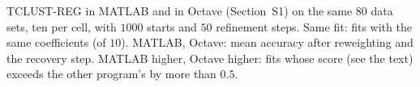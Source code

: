 \begin{table}[htbp]
\centering
\footnotesize
\caption{TCLUST-REG in MATLAB and in Octave (Section~S1) on the same $80$ data sets, ten per cell, with
$1000$ starts and $50$ refinement steps. Same fit: fits with the same coefficients (of $10$).
MATLAB, Octave: mean accuracy after reweighting and the recovery step. MATLAB higher, Octave
higher: fits whose score (see the text) exceeds the other program's by more than $0.5$.}
\label{tab:matlab}

\end{table}
